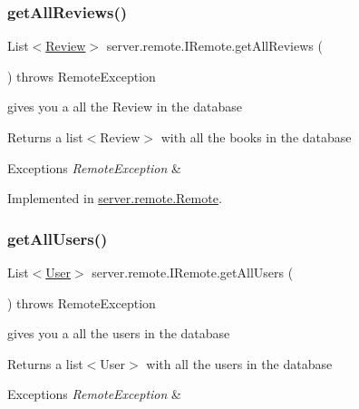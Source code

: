 \subsubsection{\texorpdfstring{get\+All\+Reviews()}{getAllReviews()}}
{\footnotesize\ttfamily List$<$\hyperlink{classserver_1_1data_1_1_review}{Review}$>$ server.\+remote.\+I\+Remote.\+get\+All\+Reviews (\begin{DoxyParamCaption}{ }\end{DoxyParamCaption}) throws Remote\+Exception}

gives you a all the Review in the database \begin{DoxyReturn}{Returns}
a list$<$\+Review$>$ with all the books in the database 
\end{DoxyReturn}

\begin{DoxyExceptions}{Exceptions}
{\em Remote\+Exception} & \\
\hline
\end{DoxyExceptions}


Implemented in \hyperlink{classserver_1_1remote_1_1_remote_a22538e64b45f5f93237b455100243b44}{server.\+remote.\+Remote}.

\mbox{\label{interfaceserver_1_1remote_1_1_i_remote_a3ff8752a1911b6ca54fc4a04af90fe7a}} 
\subsubsection{\texorpdfstring{get\+All\+Users()}{getAllUsers()}}
{\footnotesize\ttfamily List$<$\hyperlink{classserver_1_1data_1_1_user}{User}$>$ server.\+remote.\+I\+Remote.\+get\+All\+Users (\begin{DoxyParamCaption}{ }\end{DoxyParamCaption}) throws Remote\+Exception}

gives you a all the users in the database \begin{DoxyReturn}{Returns}
a list$<$\+User$>$ with all the users in the database 
\end{DoxyReturn}

\begin{DoxyExceptions}{Exceptions}
{\em Remote\+Exception} & \\
\hline
\end{DoxyExceptions}


